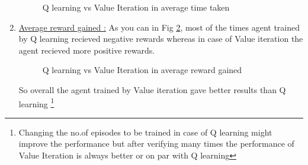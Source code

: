 \documentclass[journal,12pt,onecolumn]{IEEEtran}
\theoremstyle{remark}
\numberwithin{equation}{section}
\begin{document}
\begin{enumerate}
		\begin{figure}[ht]%
                 \centering
                 \qquad
                 \caption{Q learning vs Value Iteration in average time taken}%
                 \label{fig:2}%
                \end{figure}
	\item \underline{Average reward gained :} As you can in Fig \ref{fig:3}, most of the times agent trained by Q learning recieved negative rewards whereas in case of Value iteration the agent recieved more positive rewards.
 
		\begin{figure}[ht]%
                 \centering
                 \qquad
                 \caption{Q learning vs Value Iteration in average reward gained}%
                 \label{fig:3}%
                \end{figure}
		So overall the agent trained by Value iteration gave better results than Q learning \footnote{Changing the no.of episodes to be trained in case of Q learning might improve the performance but after verifying many times the performance of Value Iteration is always better or on par with Q learning} 
        \end{enumerate}
\end{document}
